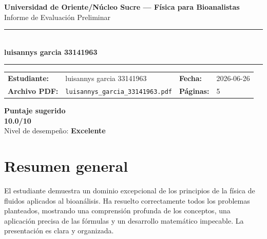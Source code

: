 \documentclass[11pt,a4paper]{article}
\begin{document}
\begin{center}
  {\Large\bfseries\color{azulTitulo} Universidad de Oriente/Núcleo Sucre --- Física para Bioanalistas}\\[4pt]
  {\large Informe de Evaluación Preliminar}\\[12pt]
  \rule{\linewidth}{1.2pt}\\[6pt]
  {\LARGE\bfseries luisannys garcia 33141963}\\[4pt]
  \rule{\linewidth}{0.6pt}
\end{center}

\vspace{4pt}
\begin{tcolorbox}[cajaTitulo, title=Datos del informe]
\begin{tabular}{@{}llll@{}}
  \textbf{Estudiante:}  & luisannys garcia 33141963  &
  \textbf{Fecha:}       & 2026-06-26 \\[4pt]
  \textbf{Archivo PDF:} & \texttt{luisannys\_garcia\_33141963.pdf}  &
  \textbf{Páginas:}     & 5 \\
\end{tabular}
\end{tcolorbox}

\vspace{6pt}
\begin{center}
  \begin{tcolorbox}[
    enhanced,
    colback=white, colframe=desempeno_excelente,
    width=0.62\linewidth,
    boxrule=2pt,
    halign=center, valign=center,
    top=8pt, bottom=8pt,
  ]
    \centering
    {\large\bfseries Puntaje sugerido}\\[6pt]
    {\Huge\bfseries\color{desempeno_excelente} 10.0/10}\\[6pt]
    {\large Nivel de desempeño: \textbf{\color{desempeno_excelente} Excelente}}
  \end{tcolorbox}
\end{center}

\section*{Resumen general}
El estudiante demuestra un dominio excepcional de los principios de la física de fluidos aplicados al bioanálisis. Ha resuelto correctamente todos los problemas planteados, mostrando una comprensión profunda de los conceptos, una aplicación precisa de las fórmulas y un desarrollo matemático impecable. La presentación es clara y organizada.
\end{document}
